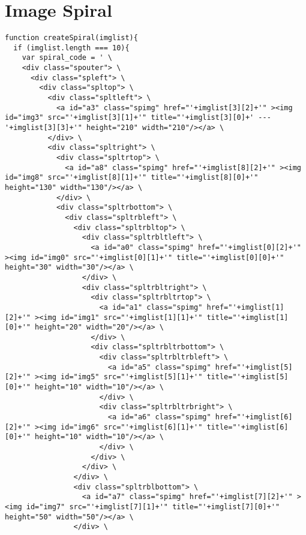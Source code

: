 \section{Image Spiral}
\label{s:imgspiral}

\begin{listing}[!htbp] %
  \tiny
  \begin{verbatim}
function createSpiral(imglist){
  if (imglist.length === 10){
    var spiral_code = ' \
    <div class="spouter"> \
      <div class="spleft"> \
        <div class="spltop"> \
          <div class="spltleft"> \
            <a id="a3" class="spimg" href="'+imglist[3][2]+'" ><img id="img3" src="'+imglist[3][1]+'" title="'+imglist[3][0]+' --- '+imglist[3][3]+'" height="210" width="210"/></a> \
          </div> \
          <div class="spltright"> \
            <div class="spltrtop"> \
              <a id="a8" class="spimg" href="'+imglist[8][2]+'" ><img id="img8" src="'+imglist[8][1]+'" title="'+imglist[8][0]+'" height="130" width="130"/></a> \
            </div> \
            <div class="spltrbottom"> \
              <div class="spltrbleft"> \
                <div class="spltrbltop"> \
                  <div class="spltrbltleft"> \
                    <a id="a0" class="spimg" href="'+imglist[0][2]+'" ><img id="img0" src="'+imglist[0][1]+'" title="'+imglist[0][0]+'" height="30" width="30"/></a> \
                  </div> \
                  <div class="spltrbltright"> \
                    <div class="spltrbltrtop"> \
                      <a id="a1" class="spimg" href="'+imglist[1][2]+'" ><img id="img1" src="'+imglist[1][1]+'" title="'+imglist[1][0]+'" height="20" width="20"/></a> \
                    </div> \
                    <div class="spltrbltrbottom"> \
                      <div class="spltrbltrbleft"> \
                        <a id="a5" class="spimg" href="'+imglist[5][2]+'" ><img id="img5" src="'+imglist[5][1]+'" title="'+imglist[5][0]+'" height="10" width="10"/></a> \
                      </div> \
                      <div class="spltrbltrbright"> \
                        <a id="a6" class="spimg" href="'+imglist[6][2]+'" ><img id="img6" src="'+imglist[6][1]+'" title="'+imglist[6][0]+'" height="10" width="10"/></a> \
                      </div> \
                    </div> \
                  </div> \
                </div> \
                <div class="spltrblbottom"> \
                  <a id="a7" class="spimg" href="'+imglist[7][2]+'" ><img id="img7" src="'+imglist[7][1]+'" title="'+imglist[7][0]+'" height="50" width="50"/></a> \
                </div> \

\end{verbatim}
\end{listing}
